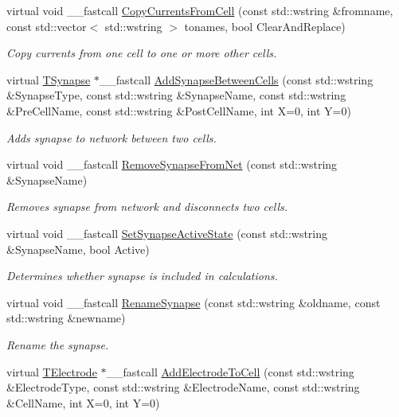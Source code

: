 \begin{DoxyCompactItemize}
virtual void \+\_\+\+\_\+fastcall \hyperlink{class_t_network_ad7e77fdd48eef933de854aa4ea33e153}{Copy\+Currents\+From\+Cell} (const std\+::wstring \&fromname, const std\+::vector$<$ std\+::wstring $>$ tonames, bool Clear\+And\+Replace)
\begin{DoxyCompactList}\small\item\em Copy currents from one cell to one or more other cells. \end{DoxyCompactList}\item 
virtual \hyperlink{class_t_synapse}{T\+Synapse} $\ast$\+\_\+\+\_\+fastcall \hyperlink{class_t_network_ae0c23d5e84b2843a431584c01f64675b}{Add\+Synapse\+Between\+Cells} (const std\+::wstring \&Synapse\+Type, const std\+::wstring \&Synapse\+Name, const std\+::wstring \&Pre\+Cell\+Name, const std\+::wstring \&Post\+Cell\+Name, int X=0, int Y=0)
\begin{DoxyCompactList}\small\item\em Adds synapse to network between two cells. \end{DoxyCompactList}\item 
virtual void \+\_\+\+\_\+fastcall \hyperlink{class_t_network_ad9715f79cef5f979183157f03b974141}{Remove\+Synapse\+From\+Net} (const std\+::wstring \&Synapse\+Name)
\begin{DoxyCompactList}\small\item\em Removes synapse from network and disconnects two cells. \end{DoxyCompactList}\item 
virtual void \+\_\+\+\_\+fastcall \hyperlink{class_t_network_a22afbf4ddfc2298708e49fc6b6cc078a}{Set\+Synapse\+Active\+State} (const std\+::wstring \&Synapse\+Name, bool Active)
\begin{DoxyCompactList}\small\item\em Determines whether synapse is included in calculations. \end{DoxyCompactList}\item 
virtual void \+\_\+\+\_\+fastcall \hyperlink{class_t_network_afc3273cd3400c77d167887f9f344295c}{Rename\+Synapse} (const std\+::wstring \&oldname, const std\+::wstring \&newname)
\begin{DoxyCompactList}\small\item\em Rename the synapse. \end{DoxyCompactList}\item 
virtual \hyperlink{class_t_electrode}{T\+Electrode} $\ast$\+\_\+\+\_\+fastcall \hyperlink{class_t_network_ab312ec35a227f70119bf87eaad64ed7f}{Add\+Electrode\+To\+Cell} (const std\+::wstring \&Electrode\+Type, const std\+::wstring \&Electrode\+Name, const std\+::wstring \&Cell\+Name, int X=0, int Y=0)

\end{DoxyCompactItemize}
